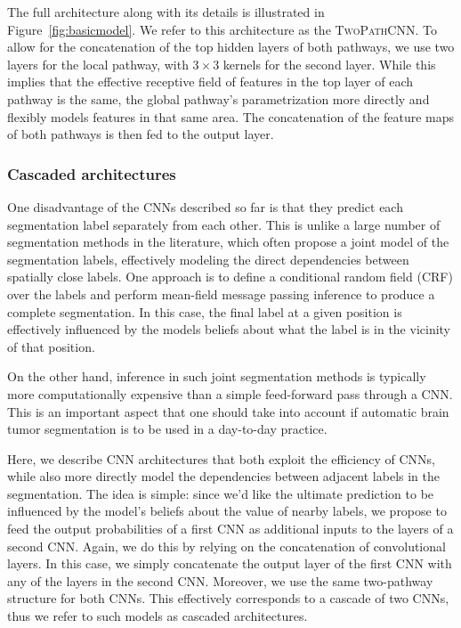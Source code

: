 \documentclass[final,5p,times,twocolumn]{elsarticle}
\begin{document}
 The full architecture along with its details is illustrated in Figure~\ref{fig:basicmodel}. We refer to this architecture as the \textsc{TwoPathCNN}.
To allow for the concatenation of the top hidden layers of both pathways, we use two layers for the local pathway, with $3\times3$ kernels for the second layer. While this implies that the effective receptive field of features in the top layer of each pathway is the same, the global pathway's parametrization more directly and flexibly models features in that same area. The concatenation of the feature maps of both pathways is then fed to the output layer. 



















\subsubsection{Cascaded architectures}
\label{sec::cascade}

One disadvantage of the CNNs described so far is that they predict each segmentation label separately from each other. This is unlike a large number of segmentation methods in the literature, which often propose a joint model of the segmentation labels, effectively modeling the direct dependencies between spatially close labels. One approach is to define a conditional random field (CRF) over the labels and perform mean-field message passing inference to produce a complete segmentation. In this case, the final label at a given position is effectively influenced by the models beliefs about what the label is in the vicinity of that position. 

On the other hand, inference in such joint segmentation methods is typically more computationally expensive than a simple feed-forward pass through a CNN. This is an important aspect that one should take into account if automatic brain tumor segmentation is to be used in a day-to-day practice.

Here, we describe CNN architectures that both exploit the efficiency of CNNs, while also more directly model the dependencies between adjacent labels in the segmentation. The idea is simple: since we'd like the ultimate prediction to be influenced by the model's beliefs about the value of nearby labels, we propose to feed the output probabilities of a first CNN as additional inputs to the layers of a second CNN. Again, we do this by relying on the concatenation of convolutional layers. In this case, we simply concatenate the output layer of the first CNN with any of the layers in the second CNN. Moreover, we use the same two-pathway structure for both CNNs. This effectively corresponds to a cascade of two CNNs, thus we refer to such models as cascaded architectures.
\end{document}

